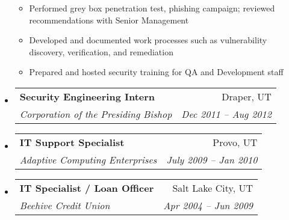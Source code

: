 \documentclass[letterpaper,11pt]{article}
\makeatletter
\newcommand{\resitem}[1]{\item #1 \vspace{-2pt}}
\newcommand{\ressubheading}[4]{
\begin{tabular*}{6.5in}{l@{\extracolsep{\fill}}r}
		\textbf{#1} & #2 \\
		\textit{#3} & \textit{#4} \\
\end{tabular*}\vspace{-6pt}}
\makeatother
\begin{document}
\begin{itemize}
{\begin{itemize}
					\resitem{Performed grey box penetration test, phishing campaign; reviewed recommendations with Senior Management}
					\resitem{Developed and documented work processes such as vulnerability discovery, verification, and remediation}
					\resitem{Prepared and hosted security training for QA and Development staff}
				\end{itemize}
				}
		\item			
			\ressubheading{Security Engineering Intern}{Draper, UT}{Corporation of the Presiding Bishop}{Dec 2011 -- Aug 2012}
\begin{comment}				{ \footnotesize
				\begin{itemize}
					\resitem{Monitored worldwide network traffic for security incidents using SIEM technology}
					\resitem{Proactively recognized and reported anomalies in network traffic for firewalls, routers, IDS, Oracle devices, Linux/Unix devices, and Windows devices}
					\resitem{Identified, investigated and reported to the CISO on individuals or organizations who had expressed intent to cause harm to the company and its interests}
				\end{itemize}
\end{comment}
		\item 
			\ressubheading{IT Support Specialist}{Provo, UT}{Adaptive Computing Enterprises}{July 2009 -- Jan 2010}
\begin{comment}
				{ \footnotesize
				\begin{itemize}
					\resitem{Responsible for setup, deployment, and ongoing maintenance of 80+ desktop systems running Windows and Ubuntu Linux}
					\resitem{Prepared systems for global user conference, administration and deployment of secured Samba file server, research and purchasing decision for new VoIP equipment}
				\end{itemize}
				}
\end{comment}
		\item
			\ressubheading{IT Specialist / Loan Officer}{Salt Lake City, UT}{Beehive Credit Union}{Apr 2004 -- Jun 2009}
\begin{comment}
				{ \footnotesize
				\begin{itemize}
					\resitem{Advised Board of Directors on selecting and deploying \$100k VoIP telephone system}
					\resitem{Team lead for project implementing VPN failover connections at 9 branches for disaster recovery purposes}
					\resitem{Developed and wrote ATM security procedures manual for the entire credit union}
					\resitem{Performed fraud prevention and detection as first backup to the BSA (Bank Secrecy Act) Officer}

\end{comment}
\end{itemize}
\end{document}
